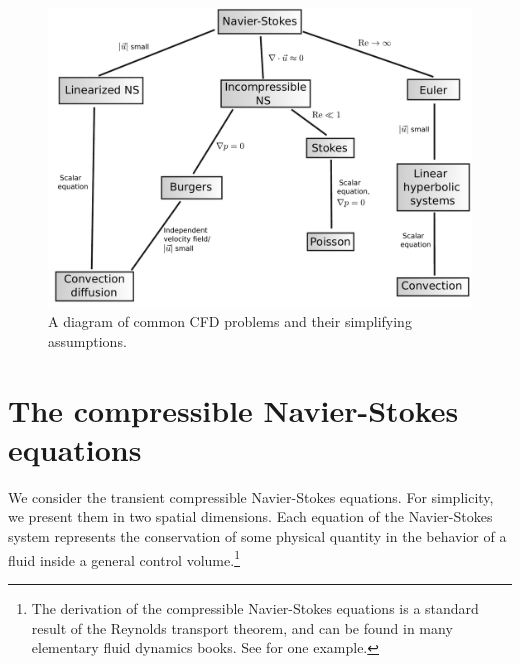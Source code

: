 

\begin{figure}[!h]
\centering
\includegraphics[scale=.475]{figs/CFD_tree.pdf}
\caption{A diagram of common CFD problems and their simplifying assumptions.}
\end{figure}

\section{The compressible Navier-Stokes equations}

We consider the transient compressible Navier-Stokes equations. For simplicity, we present them in two spatial dimensions. Each equation of the Navier-Stokes system represents the conservation of some physical quantity in the behavior of a fluid inside a general control volume.\footnote{The derivation of the compressible Navier-Stokes equations is a standard result of the Reynolds transport theorem, and can be found in many elementary fluid dynamics books. See \cite{Emanuel:994127} for one example.} 

